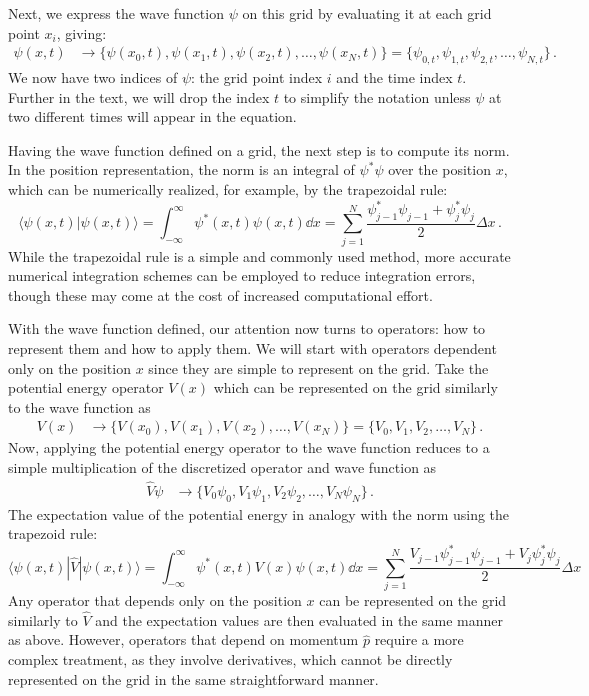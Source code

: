 Next, we express the wave function $\psi$ on this grid by evaluating it at each grid point $x_i$, giving:
\begin{align}
    \psi(x,t) &\rightarrow \{\psi(x_0,t), \psi(x_1,t), \psi(x_2,t), \dots, \psi(x_N,t)\} =  \{\psi_{0,t}, \psi_{1,t}, \psi_{2,t}, \dots, \psi_{N,t}\} \, .
\end{align}
We now have two indices of $\psi$: the grid point index $i$ and the time index $t$. Further in the text, we will drop the index $t$ to simplify the notation unless $\psi$ at two different times will appear in the equation.

Having the wave function defined on a grid, the next step is to compute its norm. In the position representation, the norm is an integral of $\psi^*\psi$ over the position $x$, which can be numerically realized, for example, by the trapezoidal rule:
\begin{equation}
    \langle \psi(x,t) | \psi(x,t) \rangle = \int_{-\infty}^\infty \psi^*(x,t)\psi(x,t) \dd x = \sum_{j=1}^N \frac{\psi^*_{j-1}\psi_{j-1} + \psi^*_{j}\psi_{j}}{2} \Delta x \, .
\end{equation}
While the trapezoidal rule is a simple and commonly used method, more accurate numerical integration schemes can be employed to reduce integration errors, though these may come at the cost of increased computational effort.

With the wave function defined, our attention now turns to operators: how to represent them and how to apply them. We will start with operators dependent only on the position $x$ since they are simple to represent on the grid. Take the potential energy operator $V(x)$ which can be represented on the grid similarly to the wave function as
\begin{align}
    V(x) &\rightarrow \{V(x_0), V(x_1), V(x_2), \dots, V(x_N)\} = \{V_0, V_1, V_2, \dots, V_N\} \, .
\end{align}
Now, applying the potential energy operator to the wave function reduces to a simple multiplication of the discretized operator and wave function as 
\begin{align}
    \hat{V}\psi &\rightarrow \{V_0 \psi_0, V_1 \psi_1, V_2 \psi_2, \dots, V_N \psi_N\} \, .
\end{align}
The expectation value of the potential energy in analogy with the norm using the trapezoid rule: 
\begin{equation}
    \langle \psi(x,t) | \hat{V} | \psi(x,t) \rangle = \int_{-\infty}^\infty \psi^*(x,t)V(x)\psi(x,t) \dd x = \sum_{j=1}^N \frac{V_{j-1}\psi^*_{j-1}\psi_{j-1} + V_{j}\psi^*_{j}\psi_{j}}{2} \Delta x
\end{equation}
Any operator that depends only on the position $x$ can be represented on the grid similarly to $\hat{V}$ and the expectation values are then evaluated in the same manner as above.
However, operators that depend on momentum $\hat{p}$ require a more complex treatment, as they involve derivatives, which cannot be directly represented on the grid in the same straightforward manner.



